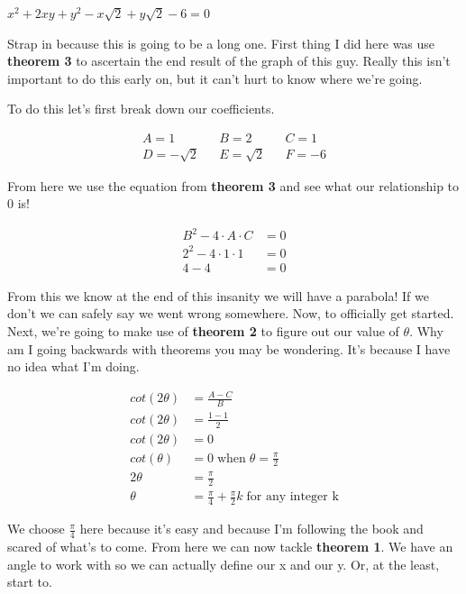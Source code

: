 \begin{problem}[1]
    $x^2 + 2xy + y^2 - x\sqrt{2} + y\sqrt{2} - 6 = 0$
\end{problem}

\begin{solution}[Solution]
    Strap in because this is going to be a long one. First thing I did here was use \textbf{theorem 3} to ascertain the end result of the graph of this guy. Really this isn't important to do this early on, but it can't hurt to know where we're going. \smallskip
    
    To do this let's first break down our coefficients. 
    
    \begin{align}
        A = 1 && B = 2 && C = 1 \\
        D = -\sqrt{2} && E = \sqrt{2} && F = -6
    \end{align}
    
    From here we use the equation from \textbf{theorem 3} and see what our relationship to 0 is! 
    
    \begin{align}
        B^2 - 4 \cdot A \cdot C &= 0 \\
        2^2 - 4 \cdot 1 \cdot 1 &= 0 \\
        4 - 4 &= 0
    \end{align}
    
    From this we know at the end of this insanity we will have a parabola! If we don't we can safely say we went wrong somewhere. Now, to officially get started. Next, we're going to make use of \textbf{theorem 2} to figure out our value of $\theta$. Why am I going backwards with theorems you may be wondering. It's because I have no idea what I'm doing. 
    
    \begin{align}
        cot(2\theta) &= \frac{A - C}{B} \\
        cot(2\theta) &= \frac{1-1}{2} \\
        cot(2\theta) &= 0 \\
        cot(\theta) &= 0 \; \text{when} \; \theta = \frac{\pi}{2} \\
        2\theta &= \frac{\pi}{2} \\
        \theta &= \frac{\pi}{4} + \frac{\pi}{2}k \; \text{for any integer k}
    \end{align}
    
    We choose $\frac{\pi}{4}$ here because it's easy and because I'm following the book and scared of what's to come. From here we can now tackle \textbf{theorem 1}. We have an angle to work with so we can actually define our x and our y. Or, at the least, start to.
    

\end{solution}
